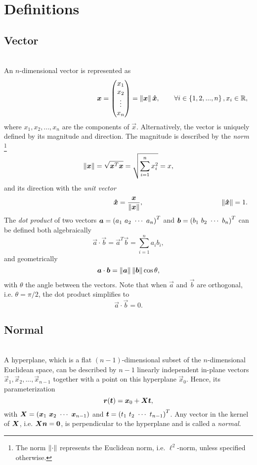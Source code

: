 \section{Definitions}
\label{app:definitions}

\subsection*{Vector}
\cite{dot_product}\\
An $n$-dimensional vector is represented as
\[
\lcr{}{
\vec{x} =
\begin{pmatrix}
x_1 \\ x_2 \\ \vdots \\ x_n
\end{pmatrix} = \norm{\vec{x}} \uvec{x},
}{
\forall i \in \set{1, 2, ..., n}, x_i \in \mathbb{R},
}
\]
where $x_1, x_2, ..., x_n$ are the components of $\vec{x}$. Alternatively, the vector is uniquely defined by its magnitude and direction. The magnitude is described by the \emph{norm}%
\footnote{The norm $\left\lVert\cdot\right\rVert$ represents the Euclidean norm, i.e. $\ell^2$-norm, unless specified otherwise.}
\[
\left\lVert\boldsymbol{x}\right\rVert = \sqrt{\boldsymbol{x}^T \boldsymbol{x}} = \sqrt{\sum_{i=1}^{n} x_i^2} = x,
\]
and its direction with the \emph{unit vector}
\[
\lcr{}{
\uvec{x} = \frac{\vec{x}}{\norm{\vec{x}}},
}{
\norm{\uvec{x}} = 1.
}
\]
The \emph{dot product} of two vectors $\vec{a} = \inlinemat{a_1, a_2, \cdots, a_n}^T$ and $\vec{b} = \inlinemat{b_1, b_2, \cdots, b_n}^T$ can be defined both algebraically
\[
\vec{a} \cdot \vec{b} = \vec{a}^T \vec{b} = \sum_{i=1}^{n} a_i b_i,
\]
and geometrically
\[
\boldsymbol{a} \cdot \boldsymbol{b} = \left\lVert\boldsymbol{a}\right\rVert \left\lVert\boldsymbol{b}\right\rVert \cos{\theta},
\]
with $\theta$ the angle between the vectors. Note that when $\vec{a}$ and $\vec{b}$ are orthogonal, i.e. $\theta = \pi/2$, the dot product simplifies to
\[
\vec{a} \cdot \vec{b} = 0.
\]

\subsection*{Normal}
\cite{euclidean_space,hyperplane,normal}\\
A hyperplane, which is a flat $(n-1)$-dimensional subset of the $n$-dimensional Euclidean space, can be described by $n-1$ linearly independent in-plane vectors $\vec{x}_1, \vec{x}_2, ..., \vec{x}_{n-1}$ together with a point on this hyperplane $\vec{x}_0$. Hence, its parameterization
\[
\boldsymbol{r}(\boldsymbol{t}) = \boldsymbol{x}_0 + \boldsymbol{X} \boldsymbol{t},
\]
with $\mat{X} = \inlinemat{\vec{x}_1, \vec{x}_2, \cdots, \vec{x}_{n-1}}$ and $\vec{t} = \inlinemat{t_1, t_2, \cdots, t_{n-1}}^T$. Any vector in the kernel of $\boldsymbol{X}$, i.e. $\boldsymbol{X} \boldsymbol{n} = \boldsymbol{0}$, is perpendicular to the hyperplane and is called a \emph{normal}.

